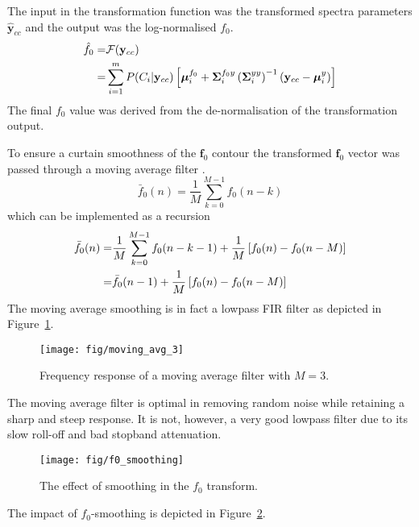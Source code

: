 The input in the transformation function was the transformed spectra parameters $\hat{\mathbf{y}}_{cc}$ and the output was the log-normalised $f_0$.
\begin{equation}
	\label{eq:pitch_transformation}
	\begin{split}
		\hat{f}_0 =& \mathcal F(\mathbf{y}_{cc})\\
		=& \sum_{i=1}^{m}P(C_i \vert \mathbf{y}_{cc}) \left[\boldsymbol{\mu}_i^{f_0} + \mathbf{\Sigma}_i^{f_0y} \left(\mathbf{\Sigma}_i^{yy}\right)^{-1} (\mathbf{y}_{cc}-\boldsymbol{\mu}_i^y)\right]
	\end{split}
\end{equation}
The final $f_0$ value was derived from the de-normalisation of the transformation output.

To ensure a curtain smoothness of the $\mathbf{f}_0$ contour the transformed $\mathbf{f}_0$ vector was passed through a moving average filter \cite{digsig}.
\begin{equation}
		\bar{f}_0(n) = \frac{1}{M}\sum_{k=0}^{M-1}f_0(n-k)
\end{equation}
which can be implemented as a recursion
\begin{equation}
	\begin{split}
		\bar{f}_0(n) = & \frac{1}{M} \sum_{k=0}^{M-1}f_0(n-k-1) + \frac{1}{M} \left[f_0(n)-f_0(n-M)\right] \\
		= & \bar{f}_0(n-1) + \frac{1}{M} \left[f_0(n)-f_0(n-M)\right] \\
	\end{split}
\end{equation}
The moving average smoothing is in fact a lowpass FIR filter as depicted in Figure~\ref{fig:moving_avg}.
\begin{figure}[htbp]
	\begin{center}
		\texttt{[image: fig/moving\_avg\_3]}
		\caption{Frequency response of a moving average filter with $M=3$.}
		\label{fig:moving_avg}
	\end{center}
\end{figure}
The moving average filter is optimal in removing random noise while retaining a sharp and steep response. It is not, however, a very good lowpass filter due to its slow roll-off and bad stopband attenuation.
\begin{figure}[htbp]
	\begin{center}
		\texttt{[image: fig/f0\_smoothing]}
		\caption{The effect of smoothing in the $f_0$ transform.}
		\label{fig:f0_smoothing}
	\end{center}
\end{figure}
The impact of $f_0$-smoothing is depicted in Figure~\ref{fig:f0_smoothing}.

